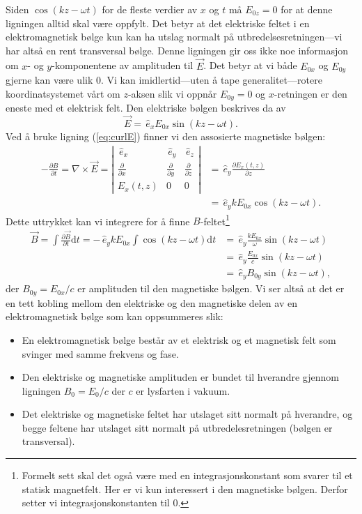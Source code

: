 \documentclass[a4paper,norsk,12pt]{article}
\def\d{\ensuremath{\text{d}}}
\def\ex{\ensuremath{\,{\hat{e}_x}}}
\def\ey{\ensuremath{\,{\hat{e}_y}}}
\def\ez{\ensuremath{\,{\hat{e}_z}}}
\begin{document}
Siden $\cos(kz-\omega t)$ for de fleste verdier av $x$ og $t$ må $E_{0z}=0$ for at denne ligningen alltid skal være oppfylt. Det betyr at det elektriske feltet i en elektromagnetisk bølge kun kan ha utslag normalt på utbredelsesretningen---vi har altså en rent transversal bølge. Denne ligningen gir oss ikke noe informasjon om $x$- og $y$-komponentene av amplituden til $\vec{E}$. Det betyr at vi både $E_{0x}$ og $E_{0y}$ gjerne kan være ulik 0. Vi kan imidlertid---uten å tape generalitet---rotere koordinatsystemet vårt om $z$-aksen slik vi oppnår $E_{0y}=0$ og $x$-retningen er den eneste med et elektrisk felt. Den elektriske bølgen beskrives da av
\begin{displaymath}
	\vec{E} = \ex E_{0x}\sin(kz - \omega t).
\end{displaymath}
Ved å bruke ligning (\ref{eq:curlE}) finner vi den assosierte magnetiske bølgen:
\begin{align*}
	-\frac{\partial B}{\partial t} = \nabla\times\vec{E} = 
	\left|\begin{array}{ccc} 
		\ex & \ey & \ez \\ \frac{\partial}{\partial x} & \frac{\partial}{\partial y} & \frac{\partial}{\partial z} \\  E_x(t,z) & 0 & 0
	\end{array}\right| 
	&= \ey\frac{\partial E_x(t,z)}{\partial z}  \\
	&= \ey kE_{0x} \cos(kz-\omega t).
\end{align*}
Dette uttrykket kan vi integrere for å finne $B$-feltet\footnote{Formelt sett skal det også være med en integrasjonskonstant som svarer til et statisk magnetfelt. Her er vi kun interessert i den magnetiske bølgen. Derfor setter vi integrasjonskonstanten til 0.}
\begin{align*}
	\vec{B} = \int\frac{\partial \vec{B}}{\partial t}\d t = -\ey kE_{0x}\int\cos(kz-\omega t)\d t &= \ey\frac{kE_{0x}}{\omega}\sin(kz-\omega t)\\
	&= \ey\frac{E_{0x}}{c}\sin(kz-\omega t) \\
	&= \ey B_{0y}\sin(kz - \omega t),
\end{align*}
der $B_{0y} = E_{0x}/c$ er amplituden til den magnetiske bølgen. Vi ser altså at det er en tett kobling mellom den elektriske og den magnetiske delen av en elektromagnetisk bølge som kan oppsummeres slik:
\begin{itemize}
\item
	En elektromagnetisk bølge består av et elektrisk og et magnetisk felt som svinger med samme frekvens og fase.
\item
	Den elektriske og magnetiske amplituden er bundet til hverandre gjennom ligningen $B_0 = E_0/c$ der $c$ er lysfarten i vakuum.
\item
	Det elektriske og magnetiske feltet har utslaget sitt normalt på hverandre, og begge feltene har utslaget sitt normalt på utbredelesretningen (bølgen er transversal).
\end{itemize}
\end{document}
